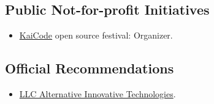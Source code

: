 \documentclass{vl}
\begin{document}
    \subsection*{Public Not-for-profit Initiatives}
    \begin{itemize}
        \item \href{https://www.kaicode.org}{KaiCode} open source festival: Organizer.
    \end{itemize}
    \subsection*{Official Recommendations}
    \begin{itemize}
        \item \href{https://github.com/volodya-lombrozo/volodya-lombrozo.github.io/blob/24eb2bbed8fac71c90ddef6ff4d93de8fb4f9f26/_cv/recommendations/letter_of_recommendation_ait.pdf}{LLC Alternative Innovative Technologies}.
    \end{itemize}
\end{document}
